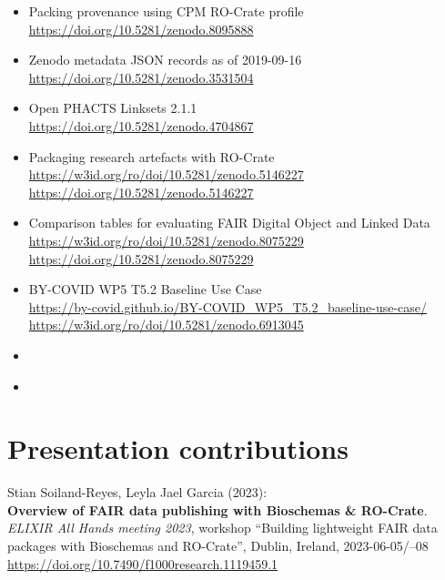 \begin{itemize}
  \item
    Packing provenance using CPM RO-Crate profile\\
    \url{https://doi.org/10.5281/zenodo.8095888}
  \item
    Zenodo metadata JSON records as of 2019-09-16\\
    \url{https://doi.org/10.5281/zenodo.3531504}
  \item
    Open PHACTS Linksets 2.1.1\\
    \url{https://doi.org/10.5281/zenodo.4704867}
  \item
    Packaging research artefacts with RO-Crate\\
    \url{https://w3id.org/ro/doi/10.5281/zenodo.5146227}~\\
    \url{https://doi.org/10.5281/zenodo.5146227}
  \item
    Comparison tables for evaluating FAIR Digital Object and Linked Data\\
    \url{https://w3id.org/ro/doi/10.5281/zenodo.8075229}~\\
    \url{https://doi.org/10.5281/zenodo.8075229}
  \item
    BY-COVID WP5 T5.2 Baseline Use Case\\
    \url{https://by-covid.github.io/BY-COVID_WP5_T5.2_baseline-use-case/}~\\
    \url{https://w3id.org/ro/doi/10.5281/zenodo.6913045}
  \item 
     \cite{rocrate1.1}
  \item 
    
\end{itemize}
  

\section{Presentation contributions}


Stian Soiland-Reyes, Leyla Jael Garcia (2023):\\
\textbf{Overview of FAIR data publishing with Bioschemas \& RO-Crate}.\\
\emph{ELIXIR All Hands meeting 2023}, workshop ``Building lightweight
FAIR data packages with Bioschemas and RO-Crate'', Dublin, Ireland,
2023-06-05/--08\\
\url{https://doi.org/10.7490/f1000research.1119459.1}

